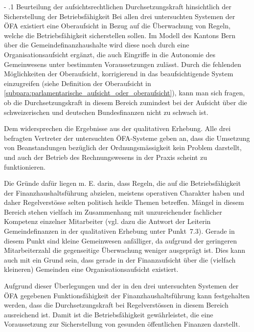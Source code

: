 \documentclass[10pt]{article}
\makeatletter
\renewcommand\paragraph{\@startsection{paragraph}{3}{0mm}{-\baselineskip}{.1\baselineskip}{\normalfont\normalsize\bfseries}}
\renewcommand\paragraph{%
\@startsection{paragraph}{3}{0mm}%
{-\baselineskip}%
{.1\baselineskip}%
{\normalfont\normalsize\bfseries}}
\makeatother
\begin{document}
\paragraph{Beurteilung der aufsichtsrechtlichen Durchsetzungskraft hinsichtlich der Sicherstellung der Betriebsfähigkeit}\label{para:beurteilung_der_aufsichtsrechtlichen_durchsetzungskraft_hinsichtlich_der_sicherstellung_der_betriebsfaehigkeit}
Bei allen drei untersuchten Systemen der ÖFA existiert eine Oberaufsicht in Bezug auf die Überwachung von Regeln, welche die Betriebsfähigkeit sicherstellen sollen. Im Modell des Kantons Bern über die Gemeindefinanzhaushalte wird diese noch durch eine Organisationsaufsicht ergänzt, die auch Eingriffe in die Autonomie des Gemeinwesens unter bestimmten Voraussetzungen zulässt. Durch die fehlenden Möglichkeiten der Oberaufsicht, korrigierend in das beaufsichtigende System einzugreifen (siehe Definition der Oberaufsicht in \vref{subpara:parlamentarische_aufsicht_oder_oberaufsicht}), kann man sich fragen, ob die Durchsetzungskraft in diesem Bereich zumindest bei der Aufsicht über die schweize­rischen und deutschen Bundesfinanzen nicht zu schwach ist.

Dem widersprechen die Ergebnisse aus der qualitativen Erhebung. Alle drei befragten Vertreter der untersuchten ÖFA-Systeme geben an, dass die Umsetzung von Beanstan­dungen bezüglich der Ordnungsmässigkeit kein Problem darstellt, und auch der Betrieb des Rechnungswesens in der Praxis scheint zu funktionieren.

Die Gründe dafür liegen m. E. darin, dass Regeln, die auf die Betriebsfähigkeit der Finanzhaushaltsführung abzielen, meistens operativen Charakter haben und daher Regelverstösse selten politisch heikle Themen betreffen. Mängel in diesem Bereich stehen vielfach im Zusammenhang mit unzureichender fachlicher Kompetenz einzelner Mitarbeiter (vgl. dazu die Antwort der Leiterin Gemeindefinanzen in der qualitativen Erhebung unter Punkt~7.3). Gerade in diesem Punkt sind kleine Gemeinwesen anfälliger, da aufgrund der geringeren Mitarbeiterzahl die gegenseitige Überwachung weniger ausgeprägt ist. Dies kann auch mit ein Grund sein, dass gerade in der Finanzaufsicht über die (vielfach kleineren) Gemeinden eine Organisationsaufsicht existiert.

Aufgrund dieser Überlegungen und der in den drei untersuchten Systemen der ÖFA gegebenen Funktionsfähigkeit der Finanzhaushaltsführung kann festgehalten werden, dass die Durchsetzungskraft bei Regelverstössen in diesem Bereich ausreichend ist. Damit ist die Betriebsfähigkeit gewährleistet, die eine Voraussetzung zur Sicherstellung von gesunden öffentlichen Finanzen darstellt.
\end{document}
